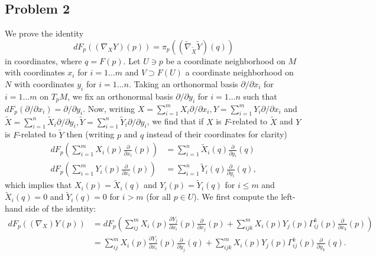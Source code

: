 \documentclass{../mathnotes}
\begin{document}
\subsection*{Problem 2}
We prove the identity
\[dF_p\left( (\nabla_XY)(p) \right)=\pi_p\left( (\tilde \nabla_{\tilde X}\tilde Y)(q) \right)\]
in coordinates, where $q=F(p)$.
Let $U\ni p$ be a coordinate neighborhood on $M$ with coordinates $x_i$ for $i=1\ldots m$ and $V\supset F(U)$
a coordinate neighborhood on $N$ with coordinates $y_i$ for $i=1\ldots n$. Taking an orthonormal basis
$\partial/\partial x_i$ for $i=1\ldots m$ on $T_pM$, we fix an orthonormal basis $\partial/\partial y_i$ for $i=1\ldots n$ such
that $dF_p(\partial/\partial x_i)=\partial/\partial y_i$.
Now, writing $X=\sum_{i=1}^m X_i\partial/\partial x_i,Y=\sum_{i=1}^mY_i\partial/\partial x_i$ and
$\tilde X=\sum_{i=1}^n\tilde X_i\partial/\partial y_i,\tilde Y=\sum_{i=1}^n\tilde Y_i\partial/\partial y_i$,
we find that if $X$ is $F$-related to $\tilde X$ and $Y$ is $F$-related to $\tilde Y$ then
(writing $p$ and $q$ instead of their coordinates for clarity)
\begin{align*}
    dF_p\left(\sum_{i=1}^mX_i(p)\frac{\partial}{\partial x_i}(p)\right) &= \sum_{i=1}^n\tilde X_i(q)\frac{\partial}{\partial y_i}(q)\\
    dF_p\left(\sum_{i=1}^mY_i(p)\frac{\partial}{\partial x_i}(p)\right) &= \sum_{i=1}^n\tilde Y_i(q)\frac{\partial}{\partial y_i}(q),
\end{align*}
which implies that $X_i(p)=\tilde X_i(q)$ and $Y_i(p)=\tilde Y_i(q)$ for $i\leq m$ and $\tilde X_i(q)=0$
and $\tilde Y_i(q)=0$ for $i>m$ (for all $p\in U$). We first compute the left-hand side of the identity:
\begin{align*}
    dF_p\left( (\nabla_X)Y(p) \right) &= dF_p\left( \sum_{ij}^mX_i(p)\frac{\partial Y_j}{\partial x_i}(p)\frac{\partial}{\partial x_j}(p)
    +\sum_{ijk}^mX_i(p)Y_j(p)\Gamma_{ij}^k(p)\frac{\partial}{\partial x_k}(p)\right)\\
    &= \sum_{ij}^mX_i(p)\frac{\partial Y_j}{\partial x_i}(p)\frac{\partial}{\partial y_j}(q)+\sum_{ijk}^mX_i(p)Y_j(p)\Gamma_{ij}^k(p)\frac{\partial}{\partial y_k}(q).
\end{align*}
\end{document}
